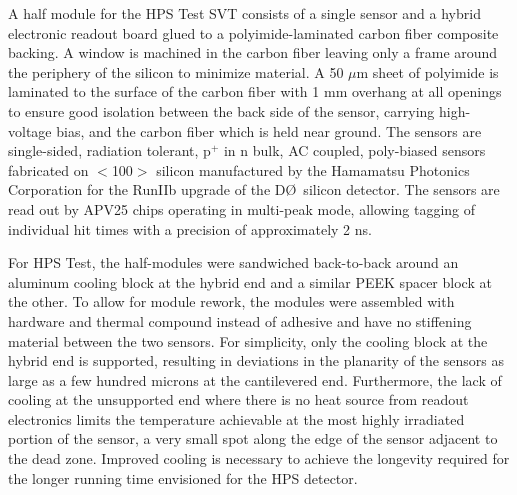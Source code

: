 A half module for the HPS Test SVT consists of a single sensor and a hybrid electronic readout board glued to a polyimide-laminated carbon fiber composite backing.  A window is machined in the carbon fiber leaving only a frame around the periphery of the silicon to minimize material. A 50 $\mu$m sheet of polyimide is laminated to the surface of the carbon fiber with 1 mm overhang at all openings to ensure good isolation between the back side of the sensor, carrying high-voltage bias, and the carbon fiber which is held near ground.  The sensors are single-sided, radiation tolerant, p$^+$ in n bulk, AC coupled, poly-biased sensors fabricated on $<$100$>$ silicon manufactured by the Hamamatsu Photonics Corporation for the RunIIb upgrade of the D\O\ silicon detector. The sensors are read out by APV25 chips operating in multi-peak mode, allowing tagging of individual hit times with a precision of approximately 2 ns.

For HPS Test, the half-modules were sandwiched back-to-back around an aluminum cooling block at the hybrid end and a similar PEEK spacer block at the other.  To allow for module rework, the modules were assembled with hardware and thermal compound instead of adhesive and have no stiffening material between the two sensors. For simplicity, only the cooling block at the hybrid end is supported, resulting in deviations in the planarity of the sensors as large as a few hundred microns at the cantilevered end. Furthermore, the lack of cooling at the unsupported end where there is no heat source from readout electronics limits the temperature achievable at the most highly irradiated portion of the sensor, a very small spot along the edge of the sensor adjacent to the dead zone.  Improved cooling is necessary to achieve the longevity required for the longer running time envisioned for the HPS detector.

